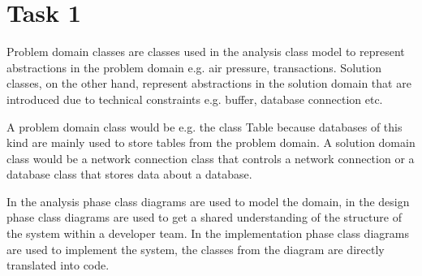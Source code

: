 \chapter{Task 1}
\begin{parlist}

\item Problem domain classes are classes used in the analysis class model to represent abstractions in the problem domain e.g. air pressure, transactions. Solution classes, on the other hand, represent abstractions in the solution domain that are introduced due to technical constraints e.g. buffer, database connection etc.

\item A problem domain class would be e.g. the class Table because databases of this kind are mainly used to store tables from the problem domain. A solution domain class would be a network connection class that controls a network connection or a database class that stores data about a database.

\item In the analysis phase class diagrams are used to model the domain, in the design phase class diagrams are used to get a shared understanding of the structure of the system within a developer team. In the implementation phase class diagrams are used to implement the system, the classes from the diagram are directly translated into code.


\end{parlist}

